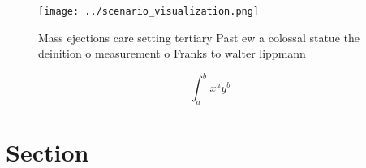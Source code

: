 \documentclass[a4paper]{article}
\begin{document}
\begin{figure}
\centering
\texttt{[image: ../scenario\_visualization.png]}
\caption{Mass ejections care setting tertiary Past ew a colossal statue the deinition o measurement o Franks to walter lippmann 
}
\end{figure}
 
\[ \int_{a}^{b}{x^{a}y^{b}} \]

\section{Section}
\end{document}
